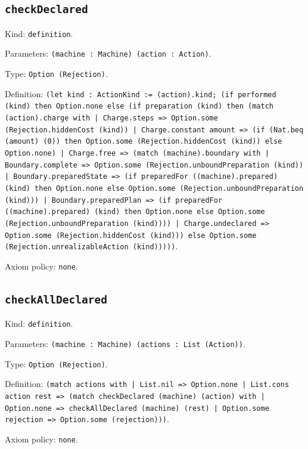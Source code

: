 \documentclass[11pt]{article}
\begin{document}
\subsection*{\texttt{checkDeclared}}
\noindent Kind: \texttt{definition}.\par
\noindent Parameters: \texttt{(machine : Machine) (action : Action)}.\par
\noindent Type: \texttt{Option (Rejection)}.\par
\noindent Definition: \texttt{(let kind : ActionKind := (action).kind; (if performed (kind) then Option.none else (if preparation (kind) then (match (action).charge with | Charge.steps => Option.some (Rejection.hiddenCost (kind)) | Charge.constant amount => (if (Nat.beq (amount) (0)) then Option.some (Rejection.hiddenCost (kind)) else Option.none) | Charge.free => (match (machine).boundary with | Boundary.complete => Option.some (Rejection.unboundPreparation (kind)) | Boundary.preparedState => (if preparedFor ((machine).prepared) (kind) then Option.none else Option.some (Rejection.unboundPreparation (kind))) | Boundary.preparedPlan => (if preparedFor ((machine).prepared) (kind) then Option.none else Option.some (Rejection.unboundPreparation (kind)))) | Charge.undeclared => Option.some (Rejection.hiddenCost (kind))) else Option.some (Rejection.unrealizableAction (kind)))))}.\par
\noindent Axiom policy: \texttt{none}.\par
\subsection*{\texttt{checkAllDeclared}}
\noindent Kind: \texttt{definition}.\par
\noindent Parameters: \texttt{(machine : Machine) (actions : List (Action))}.\par
\noindent Type: \texttt{Option (Rejection)}.\par
\noindent Definition: \texttt{(match actions with | List.nil => Option.none | List.cons action rest => (match checkDeclared (machine) (action) with | Option.none => checkAllDeclared (machine) (rest) | Option.some rejection => Option.some (rejection)))}.\par
\noindent Axiom policy: \texttt{none}.\par
\end{document}
